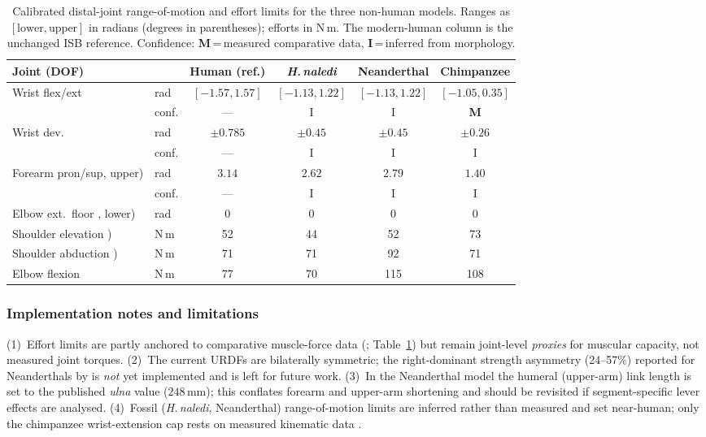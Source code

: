   \begin{table}[h]
  \centering
  \caption{Calibrated distal-joint range-of-motion and effort limits for the
  three non-human models. Ranges as $[\text{lower},\text{upper}]$ in radians
  (degrees in parentheses); efforts in N\,m. The modern-human column is the
  unchanged ISB reference. Confidence: \textbf{M}\,=\,measured comparative data,
  \textbf{I}\,=\,inferred from morphology.}
  \label{tab:rom}
  \small
  \begin{tabular}{@{}llcccc@{}}
  \toprule
  Joint (DOF) & & Human (ref.) & \textit{H.\,naledi} & Neanderthal & Chimpanzee \\
  \midrule
  Wrist flex/ext   & rad   & $[-1.57,1.57]$ & $[-1.13,1.22]$ & $[-1.13,1.22]$ & $[-1.05,0.35]$ \\
                                      & conf. & ---            & I              & I              & \textbf{M} \\
  Wrist dev.\      & rad   & $\pm0.785$     & $\pm0.45$      & $\pm0.45$      & $\pm0.26$ \\
                                      & conf. & ---            & I              & I              & I \\
  Forearm pron/sup, upper) & rad & $3.14$   & $2.62$         & $2.79$         & $1.40$ \\
                                      & conf. & ---            & I              & I              & I \\
  Elbow ext.\ floor , lower) & rad & $0$     & $0$            & $0$            & $0$ \\
  \midrule
  Shoulder elevation ) & N\,m & 52 & 44 & 52 & 73 \\
  Shoulder abduction ) & N\,m & 71 & 71 & 92 & 71 \\
  Elbow flexion          & N\,m & 77 & 70 & 115 & 108 \\
  \bottomrule
  \end{tabular}
  \end{table}

  \subsubsection{Implementation notes and limitations}
  (1)~Effort limits are partly anchored to comparative muscle-force data
  (\citealp{oneill2017}; Table~\ref{tab:rom}) but remain joint-level
  \emph{proxies} for muscular capacity, not measured joint torques. (2)~The
  current URDFs are bilaterally symmetric; the right-dominant strength asymmetry
  (24--57\%) reported for Neanderthals by \citet{shaw2012} is \emph{not} yet
  implemented and is left for future work. (3)~In the Neanderthal model the
  humeral (upper-arm) link length is set to the published \emph{ulna} value
  ($248$\,mm); this conflates forearm and upper-arm shortening and should be
  revisited if segment-specific lever effects are analysed. (4)~Fossil
  (\textit{H.\,naledi}, Neanderthal) range-of-motion limits are inferred rather
  than measured and set near-human; only the chimpanzee wrist-extension cap
  rests on measured kinematic data \citep{knuckle2020}.

